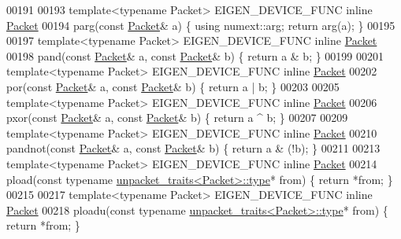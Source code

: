 \begin{DoxyCode}
00191 
00193 \textcolor{keyword}{template}<\textcolor{keyword}{typename} Packet> EIGEN\_DEVICE\_FUNC \textcolor{keyword}{inline} \hyperlink{union_eigen_1_1internal_1_1_packet}{Packet}
00194 parg(\textcolor{keyword}{const} \hyperlink{union_eigen_1_1internal_1_1_packet}{Packet}& a) \{ \textcolor{keyword}{using} numext::arg; \textcolor{keywordflow}{return} arg(a); \}
00195 
00197 \textcolor{keyword}{template}<\textcolor{keyword}{typename} Packet> EIGEN\_DEVICE\_FUNC \textcolor{keyword}{inline} \hyperlink{union_eigen_1_1internal_1_1_packet}{Packet}
00198 pand(\textcolor{keyword}{const} \hyperlink{union_eigen_1_1internal_1_1_packet}{Packet}& a, \textcolor{keyword}{const} \hyperlink{union_eigen_1_1internal_1_1_packet}{Packet}& b) \{ \textcolor{keywordflow}{return} a & b; \}
00199 
00201 \textcolor{keyword}{template}<\textcolor{keyword}{typename} Packet> EIGEN\_DEVICE\_FUNC \textcolor{keyword}{inline} \hyperlink{union_eigen_1_1internal_1_1_packet}{Packet}
00202 por(\textcolor{keyword}{const} \hyperlink{union_eigen_1_1internal_1_1_packet}{Packet}& a, \textcolor{keyword}{const} \hyperlink{union_eigen_1_1internal_1_1_packet}{Packet}& b) \{ \textcolor{keywordflow}{return} a | b; \}
00203 
00205 \textcolor{keyword}{template}<\textcolor{keyword}{typename} Packet> EIGEN\_DEVICE\_FUNC \textcolor{keyword}{inline} \hyperlink{union_eigen_1_1internal_1_1_packet}{Packet}
00206 pxor(\textcolor{keyword}{const} \hyperlink{union_eigen_1_1internal_1_1_packet}{Packet}& a, \textcolor{keyword}{const} \hyperlink{union_eigen_1_1internal_1_1_packet}{Packet}& b) \{ \textcolor{keywordflow}{return} a ^ b; \}
00207 
00209 \textcolor{keyword}{template}<\textcolor{keyword}{typename} Packet> EIGEN\_DEVICE\_FUNC \textcolor{keyword}{inline} \hyperlink{union_eigen_1_1internal_1_1_packet}{Packet}
00210 pandnot(\textcolor{keyword}{const} \hyperlink{union_eigen_1_1internal_1_1_packet}{Packet}& a, \textcolor{keyword}{const} \hyperlink{union_eigen_1_1internal_1_1_packet}{Packet}& b) \{ \textcolor{keywordflow}{return} a & (!b); \}
00211 
00213 \textcolor{keyword}{template}<\textcolor{keyword}{typename} Packet> EIGEN\_DEVICE\_FUNC \textcolor{keyword}{inline} \hyperlink{union_eigen_1_1internal_1_1_packet}{Packet}
00214 pload(\textcolor{keyword}{const} \textcolor{keyword}{typename} \hyperlink{union_eigen_1_1internal_1_1_packet}{unpacket\_traits<Packet>::type}* from) \{ \textcolor{keywordflow}{return} *from; \}
00215 
00217 \textcolor{keyword}{template}<\textcolor{keyword}{typename} Packet> EIGEN\_DEVICE\_FUNC \textcolor{keyword}{inline} \hyperlink{union_eigen_1_1internal_1_1_packet}{Packet}
00218 ploadu(\textcolor{keyword}{const} \textcolor{keyword}{typename} \hyperlink{union_eigen_1_1internal_1_1_packet}{unpacket\_traits<Packet>::type}* from) \{ \textcolor{keywordflow}{return} *from; \}

\end{DoxyCode}

